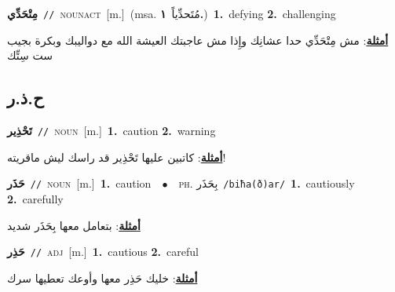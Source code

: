 \documentclass[10pt,a4paper,twoside]{article} %
\begin{document}
\begin{multicols}{2}
{\setlength\topsep{0pt}\textbf{\foreignlanguage{arabic}{مِتْحَدِّي}}\ {\color{gray}\texttt{//}\color{black}}\ \textsc{noun\textunderscore act}\ [m.]\ \color{gray}(msa. \foreignlanguage{arabic}{مُتَحدِّياً}~\foreignlanguage{arabic}{\textbf{١.}})\color{black}\ \textbf{1.}~defying  \textbf{2.}~challenging\  \begin{flushright}\color{gray}\foreignlanguage{arabic}{\textbf{\underline{\foreignlanguage{arabic}{أمثلة}}}: مش مِتْحَدِّي حدا عشانِك وإِذا مش عاجبتك العيشة الله مع دواليبك وبكرة بجيب ست سِتِّك}\end{flushright}\color{black}} \vspace{2mm}

\vspace{-3mm}
\subsection*{\color{blue}\foreignlanguage{arabic}{ح.ذ.ر}\color{blue}{}} 

{\setlength\topsep{0pt}\textbf{\foreignlanguage{arabic}{تَحْذِير}}\ {\color{gray}\texttt{//}\color{black}}\ \textsc{noun}\ [m.]\ \textbf{1.}~caution  \textbf{2.}~warning\  \begin{flushright}\color{gray}\foreignlanguage{arabic}{\textbf{\underline{\foreignlanguage{arabic}{أمثلة}}}: كاتبين عليها تَحْذِير قد راسك ليش ماقريته!}\end{flushright}\color{black}} \vspace{2mm}

{\setlength\topsep{0pt}\textbf{\foreignlanguage{arabic}{حَذَر}}\ {\color{gray}\texttt{//}\color{black}}\ \textsc{noun}\ [m.]\ \textbf{1.}~caution\ \ $\bullet$\ \ \textsc{ph.} \color{gray} \foreignlanguage{arabic}{بِحَذَر}\color{black}\ {\color{gray}\texttt{/{\sffamily biħa(ð)ar}/}\color{black}}\ \textbf{1.}~cautiously  \textbf{2.}~carefully\  \begin{flushright}\color{gray}\foreignlanguage{arabic}{\textbf{\underline{\foreignlanguage{arabic}{أمثلة}}}: بتعامل معها بِحَذَر شديد}\end{flushright}\color{black}} \vspace{2mm}

{\setlength\topsep{0pt}\textbf{\foreignlanguage{arabic}{حَذِر}}\ {\color{gray}\texttt{//}\color{black}}\ \textsc{adj}\ [m.]\ \textbf{1.}~cautious  \textbf{2.}~careful\  \begin{flushright}\color{gray}\foreignlanguage{arabic}{\textbf{\underline{\foreignlanguage{arabic}{أمثلة}}}: خليك حَذِر معها وأوعك تعطيها سرك}\end{flushright}\color{black}} \vspace{2mm}


\end{multicols}
\end{document}

